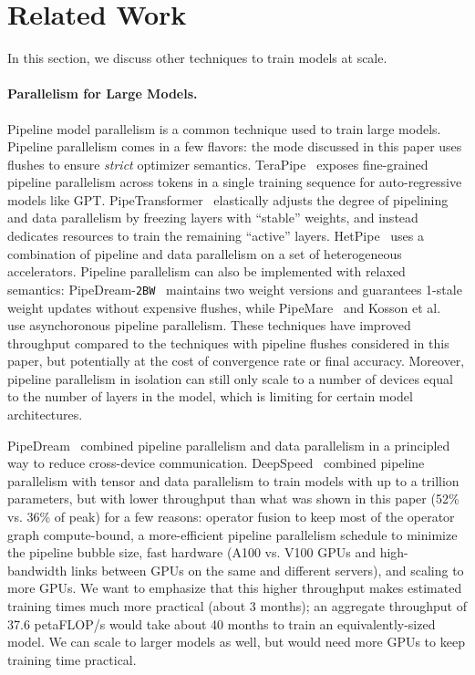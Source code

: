 \section{Related Work}

In this section, we discuss other techniques to train models at scale.

\paragraph{Parallelism for Large Models.} Pipeline model parallelism is a common technique used to train large models. Pipeline parallelism comes in a few flavors: the mode discussed in this paper uses flushes to ensure \emph{strict} optimizer semantics. TeraPipe~\cite{li2021terapipe} exposes fine-grained pipeline parallelism across tokens in a single training sequence for auto-regressive models like GPT. PipeTransformer~\cite{he2021pipetransformer} elastically adjusts the degree of pipelining and data parallelism by freezing layers with ``stable'' weights, and instead dedicates resources to train the remaining ``active'' layers. HetPipe~\cite{park2020hetpipe} uses a combination of pipeline and data parallelism on a set of heterogeneous accelerators. Pipeline parallelism can also be implemented with relaxed semantics: PipeDream-\texttt{2BW}~\cite{narayanan2021memory} maintains two weight versions and guarantees 1-stale weight updates without expensive flushes, while PipeMare~\cite{yang2021pipemare} and Kosson et al.~\cite{pb2021kosson} use asynchoronous pipeline parallelism. These techniques have improved throughput compared to the techniques with pipeline flushes considered in this paper, but potentially at the cost of convergence rate or final accuracy. Moreover, pipeline parallelism in isolation can still only scale to a number of devices equal to the number of layers in the model, which is limiting for certain model architectures.

PipeDream~\cite{narayanan2019pipedream} combined pipeline parallelism and data parallelism in a principled way to reduce cross-device communication. DeepSpeed~\cite{deepspeed3Dparallelism} combined pipeline parallelism with tensor and data parallelism to train models with up to a trillion parameters, but with lower throughput than what was shown in this paper (52\% vs. 36\% of peak) for a few reasons: operator fusion to keep most of the operator graph compute-bound, a more-efficient pipeline parallelism schedule to minimize the pipeline bubble size, fast hardware (A100 vs. V100 GPUs and high-bandwidth links between GPUs on the same and different servers), and scaling to more GPUs. We want to emphasize that this higher throughput makes estimated training times much more practical (about 3 months); an aggregate throughput of 37.6 petaFLOP/s would take about 40 months to train an equivalently-sized model. We can scale to larger models as well, but would need more GPUs to keep training time practical.

